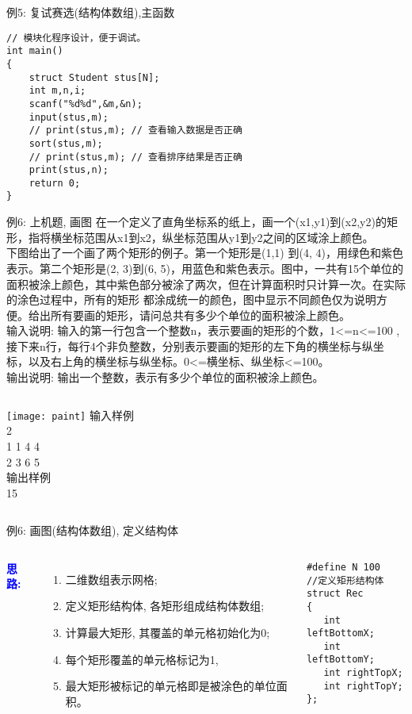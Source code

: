 \begin{frame}{例5: 复试赛选(结构体数组),主函数}
\begin{lstlisting}
// 模块化程序设计，便于调试。
int main()
{
    struct Student stus[N]; 
    int m,n,i;
    scanf("%d%d",&m,&n);
    input(stus,m); 
    // print(stus,m); // 查看输入数据是否正确
    sort(stus,m);
    // print(stus,m); // 查看排序结果是否正确
    print(stus,n);
    return 0;
}
\end{lstlisting}
\end{frame}

\begin{frame}{例6: 上机题, 画图}
在一个定义了直角坐标系的纸上，画一个(x1,y1)到(x2,y2)的矩形，指将横坐标范围从x1到x2，纵坐标范围从y1到y2之间的区域涂上颜色。\\ 
下图给出了一个画了两个矩形的例子。第一个矩形是(1,1) 到(4, 4)，用绿色和紫色表示。第二个矩形是(2, 3)到(6, 5)，用蓝色和紫色表示。图中，一共有15个单位的面积被涂上颜色，其中紫色部分被涂了两次，但在计算面积时只计算一次。在实际的涂色过程中，所有的矩形 都涂成统一的颜色，图中显示不同颜色仅为说明方便。给出所有要画的矩形，请问总共有多少个单位的面积被涂上颜色。 \\
输入说明: 输入的第一行包含一个整数n，表示要画的矩形的个数，1<=n<=100 ,接下来n行，每行4个非负整数，分别表示要画的矩形的左下角的横坐标与纵坐标，以及右上角的横坐标与纵坐标。0<=横坐标、纵坐标<=100。\\
输出说明: 输出一个整数，表示有多少个单位的面积被涂上颜色。
\begin{columns}[T]
	\texttt{[image: paint]}
	输入样例\\	
	2 \\
	1 1 4 4\\ 
	2 3 6 5 \\
	输出样例\\	
	15
\end{columns}
\medskip
\end{frame}

\begin{frame}{例6: 画图(结构体数组), 定义结构体}
\begin{columns}[T]
\textbf{\textcolor{blue}{思路:}}
\begin{enumerate}
	\item 二维数组表示网格;
	\item 定义矩形结构体, 各矩形组成结构体数组;
	\item 计算最大矩形, 其覆盖的单元格初始化为0; 
	\item 每个矩形覆盖的单元格标记为1, 
	\item 最大矩形被标记的单元格即是被涂色的单位面积。
\end{enumerate}
\begin{lstlisting}
#define N 100
//定义矩形结构体 
struct Rec
{
   int leftBottomX;
   int leftBottomY;
   int rightTopX;
   int rightTopY;
};
\end{lstlisting}
\end{columns}
\end{frame}

